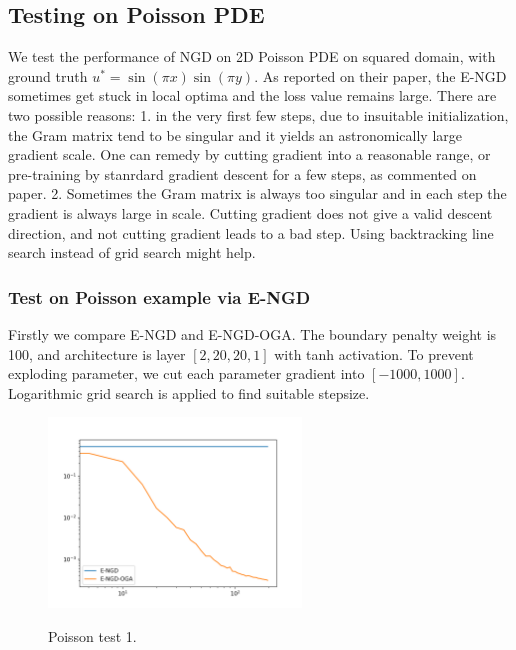 \documentclass{article}
\begin{document}

\subsection{Testing on Poisson PDE}
We test the performance of NGD on 2D Poisson PDE on squared domain, with ground truth $u^*=\sin(\pi x)\sin(\pi y)$. As reported on their paper, the E-NGD sometimes get stuck in local optima and the loss value remains large. There are two possible reasons: 1. in the very first few steps, due to insuitable initialization, the Gram matrix tend to be singular and it yields an astronomically large gradient scale. One can remedy by cutting gradient into a reasonable range, or pre-training by stanrdard gradient descent for a few steps, as commented on paper. 2. Sometimes the Gram matrix is always too singular and in each step the gradient is always large in scale. Cutting gradient does not give a valid descent direction, and not cutting gradient leads to a bad step. Using backtracking line search instead of grid search might help. 

\subsubsection*{Test on Poisson example via E-NGD}
Firstly we compare E-NGD and E-NGD-OGA. The boundary penalty weight is 100, and architecture is layer $[2,20,20,1]$ with tanh activation. To prevent exploding parameter, we cut each parameter gradient into $[-1000,1000]$. Logarithmic grid search is applied to find suitable stepsize. 
\begin{figure}[hbt]
    \centering
    \includegraphics[width=0.6\textwidth]{figures/poissont1.png}
\label{fig:poissont1}
\caption{Poisson test 1.}
\end{figure}



%
%
\end{document}
